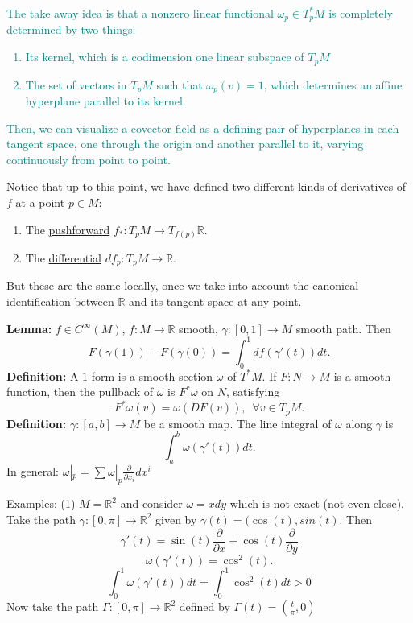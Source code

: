 \documentclass[10.5pt]{article}
\newcommand\R{\ensuremath{\mathbb{R}}}
\begin{document}
\textcolor{teal}{The take away idea is that a nonzero linear functional $\omega_p\in T_p^*M$ is completely determined by two things:}
\textcolor{teal}{\begin{enumerate}
    \item Its kernel, which is a codimension one linear subspace of $T_pM$
    \item The set of vectors in $T_pM$ such that $\omega_p(v)=1$, which determines an affine hyperplane parallel to its kernel.
\end{enumerate}}
\textcolor{teal}{Then, we can visualize a covector field as a defining pair of hyperplanes in each tangent space, one through the origin and another parallel to it, varying continuously from point to point.
}

Notice that up to this point, we have defined two different kinds of derivatives of $f$ at a point $p\in M$:
\begin{enumerate}
    \item The \underline{pushforward} $f_*:T_pM\to T_{f(p)}\R$.
    \item The \underline{differential} $df_p:T_pM\to \R$.
\end{enumerate}
But these are the same locally, once we take into account the canonical identification between $\R$ and its tangent space at any point.

\textbf{Lemma:} $f\in C^\infty(M)$, $f:M\to \R$ smooth, $\gamma:[0,1]\to M$ smooth path. Then 
\[F(\gamma(1))-F(\gamma(0))=\int_0^1df(\gamma'(t))dt.\]
\textbf{Definition:} A $1$-form is a smooth section $\omega$ of $T^*M$. If $F:N\to M$ is a smooth function, then the pullback of $\omega$ is $F^*\omega$ on $N$, satisfying 
\[F^*\omega(v)=\omega(DF(v)),\,\,\, \forall v\in T_pM.\]
\textbf{Definition:} $\gamma:[a,b]\to M$ be a smooth map. The line integral of $\omega$ along $\gamma$ is 
\[\int_a^b\omega(\gamma'(t))dt.\]
In general: $\omega|_p=\sum\omega|_p\frac{\partial }{\partial x_i} dx^i$

Examples: (1) $M=\R^2$ and consider $\omega=xdy$ which is not exact (not even close). Take the path $\gamma:[0,\pi]\to \R^2$ given by $\gamma(t)=(\cos(t),sin(t)$. Then 
\[\gamma'(t)=\sin(t)\frac{\partial}{\partial x}+\cos(t)\frac{\partial}{\partial y}\]
\[\omega(\gamma'(t))=\cos^2(t).\]
\[\int_0^1\omega(\gamma'(t))dt=\int_0^1\cos^2(t)dt>0\]
Now take the path $\Gamma:[0,\pi]\to \R^2$ defined by $\Gamma(t)=(\frac{t}{\pi},0)$
\end{document}
